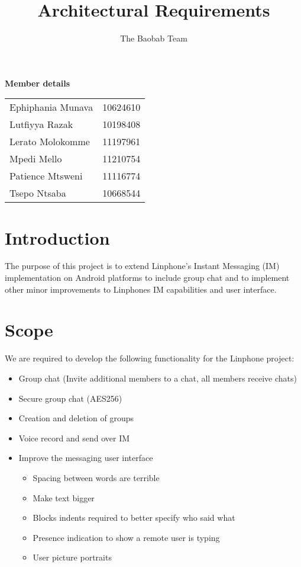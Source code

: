\documentclass[a4paper]{article}
\title{Architectural Requirements}
\author{The Baobab Team}
\begin{document}
\newpage


\newpage
\begin{center}
\LARGE \textbf{Member details}\\
\begin{tabular}{ll}
Ephiphania Munava&10624610\\
Lutfiyya Razak&10198408\\
Lerato Molokomme&11197961\\
Mpedi Mello&11210754\\
Patience Mtsweni&11116774\\
Tsepo Ntsaba&10668544\\

\end{tabular}
\end{center}

\newpage

\tableofcontents

\newpage

\section{\textbf{Introduction}}
The purpose of this project is to extend Linphone's Instant Messaging (IM) implementation on Android platforms to include group chat and to implement other minor improvements to Linphones IM capabilities and user interface.
\section{\textbf{Scope}}
We are required to develop the following functionality for the Linphone project:
\begin{itemize}
\item Group chat (Invite additional members to a chat, all members receive chats)
\item Secure group chat (AES256)
\item Creation and deletion of groups
\item Voice record and send over IM
\item Improve the messaging user interface
	\begin{itemize}
		\item Spacing between words are terrible
		\item Make text bigger
		\item Blocks indents required to better specify who said what
		\item Presence indication to show a remote user is typing
		\item User picture portraits
	\end{itemize}
\end{itemize}
\end{document}
